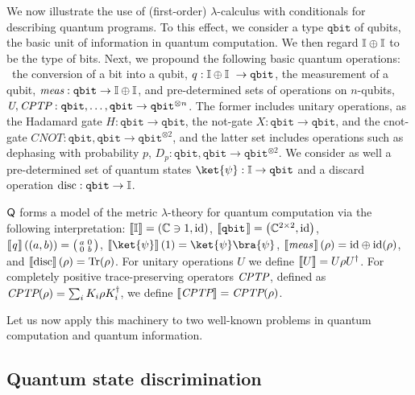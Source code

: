 We now illustrate the use of (first-order) $\lambda$-calculus with conditionals for describing quantum
programs. To this effect, we consider a type $\mathtt{qbit}$ of qubits, the
basic unit of information in quantum computation. We then regard $\mathbb{I} \oplus
\mathbb{I}$ to be the type of bits. Next, we propound the following
basic quantum operations:  the conversion of a bit into a qubit, $q : \typeI
\oplus \typeI  \to \mathtt{qbit}$, the measurement of a qubit,
$\emph{meas}:\mathtt{qbit} \to \mathbb{I} \oplus \mathbb{I}$, and pre-determined sets of
operations on $n$-qubits, $\emph{U},\emph{CPTP}:\mathtt{qbit},\ldots,\mathtt{qbit} \to
\mathtt{qbit}^{\otimes n}$. The former includes unitary operations, as the Hadamard
gate $H : \mathtt{qbit} \to \mathtt{qbit}$, the not-gate $X : \mathtt{qbit} \to
\mathtt{qbit}$, and the cnot-gate $CNOT : \mathtt{qbit},\mathtt{qbit} \to
\mathtt{qbit}^{\otimes 2}$, and the latter set includes operations such as dephasing with probability $p$, $D_p : \mathtt{qbit},\mathtt{qbit} \to
\mathtt{qbit}^{\otimes 2}$. We consider as well a pre-determined set of quantum
states $\ket{\psi} : \typeI \to \mathtt{qbit}$ and a discard operation $\text{disc}: \mathtt{qbit} \to \mathbb{I}$.  

$\mathsf{Q}$ forms a model of the metric $\lambda$-theory for quantum computation via the following interpretation: $\left \llbracket \mathbb{I} \right \rrbracket= \left(\mathbb{C} \ni  1, \mathrm{id}\right)$, 
$\left \llbracket \mathtt{qbit} \hspace{1pt} \right \rrbracket= \left(\mathbb{C}^{2\times2}, \mathrm{id}\right)$, 
$\left \llbracket \emph{q} \hspace{1pt} \right \rrbracket((a,b)) = \big(\begin{smallmatrix}
  a & 0\\
  0 & b
\end{smallmatrix}\big)$, 
 $\sem{\ket{\psi}} (1)= \ket{\psi} \bra{\psi}$,
$\left \llbracket \emph{meas} \hspace{1pt} \right \rrbracket (\rho)= \mathrm{id} \oplus \mathrm{id} (\rho)$, and $\left \llbracket \text{disc} \right \rrbracket (\rho)= \text{Tr} (\rho)$.
For unitary operations $U$ we define $\left \llbracket U \right \rrbracket= U \rho U^{\dag}$.
For completely positive trace-preserving operators $\emph{CPTP}$, defined as $\emph{CPTP} (\rho) = \sum_i K_i \rho K_i^{\dag}$, we define  $\left \llbracket \emph{CPTP} \right \rrbracket = \emph{CPTP}(\rho)$.

Let us now apply this machinery to two well-known problems in quantum computation
and quantum information.

\subsection{Quantum state discrimination}


